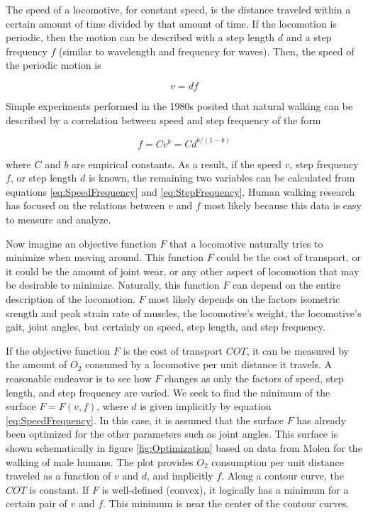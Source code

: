 The speed of a locomotive, for constant speed, is the distance traveled within a certain amount of time divided by that amount of time. If the locomotion is periodic, then the motion can be described with a step length $d$ and a step frequency $f$ (similar to wavelength and frequency for waves). Then, the speed of the periodic motion is

\begin{equation}
v = df
\label{eq:SpeedFrequency}
\end{equation}

Simple experiments performed in the 1980s posited that natural walking can be described by a correlation between speed and step frequency of the form

\begin{equation}
f = C v^{b} = Cd^{b/(1-b)}
\label{eq:StepFrequency}
\end{equation}

where $C$ and $b$ are empirical constants. As a result, if the speed $v$, step frequency $f$, or step length $d$ is known, the remaining two variables can be calculated from equations \ref{eq:SpeedFrequency} and \ref{eq:StepFrequency}. Human walking research has focused on the relations between $v$ and $f$ most likely because this data is easy to measure and analyze.

Now imagine an objective function $F$ that a locomotive naturally tries to minimize when moving around. This function $F$ could be the cost of transport, or it could be the amount of joint wear, or any other aspect of locomotion that may be desirable to minimize. Naturally, this function $F$ can depend on the entire description of the locomotion. $F$ most likely depends on the factors isometric srength and peak strain rate of muscles, the locomotive's weight, the locomotive's gait, joint angles, but certainly on speed, step length, and step frequency.

If the objective function $F$ is the cost of transport $COT$, it can be measured by the amount of $O_2$ consumed by a locomotive per unit distance it travels. A reasonable endeavor is to see how $F$ changes as only the factors of speed, step length, and step frequency are varied. We seek to find the minimum of the surface $F = F(v,f)$, where $d$ is given implicitly by equation \ref{eq:SpeedFrequency}. In this case, it is assumed that the surface $F$ has already been optimized for the other parameters such as joint angles. This surface is shown schematically in figure \ref{fig:Optimization} based on data from Molen \cite{molen72b} for the walking of male humans. The plot provides $O_{2}$ consumption per unit distance traveled as a function of $v$ and $d$, and implicitly $f$. Along a contour curve, the $COT$ is constant. If $F$ is well-defined (convex), it logically has a minimum for a certain pair of $v$ and $f$. This minimum is near the center of the contour curves.

